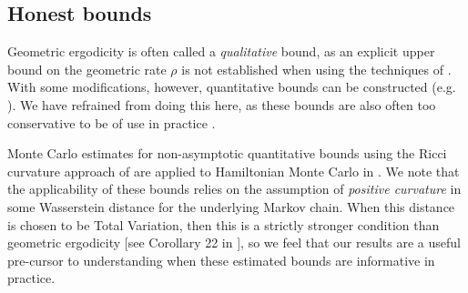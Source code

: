 \documentclass[bj,numbers,noshowframe]{imsart}
\theoremstyle{definition}
\theoremstyle{plain}
\theoremstyle{definition}
\begin{document}


\subsection{Honest bounds}

Geometric ergodicity is often called a \emph{qualitative} bound, as an explicit upper bound on the geometric rate $\rho$ is not established when using the techniques of \citep{roberts1996geometric}.  With some modifications, however, quantitative bounds can be constructed (e.g. \citep{jones2001honest}).  We have refrained from doing this here, as these bounds are also often too conservative to be of use in practice \citep{jones2001honest}.

Monte Carlo estimates for non-asymptotic quantitative bounds using the Ricci curvature approach of \citep{ollivier2009ricci} are applied to Hamiltonian Monte Carlo in \citep{seiler2014positive}.  We note that the applicability of these bounds relies on the assumption of \emph{positive curvature} in some Wasserstein distance for the underlying Markov chain.  When this distance is chosen to be Total Variation, then this is a strictly stronger condition than geometric ergodicity [see Corollary 22 in \citep{ollivier2009ricci}], so we feel that our results are a useful pre-cursor to understanding when these estimated bounds are informative in practice.
\end{document}
